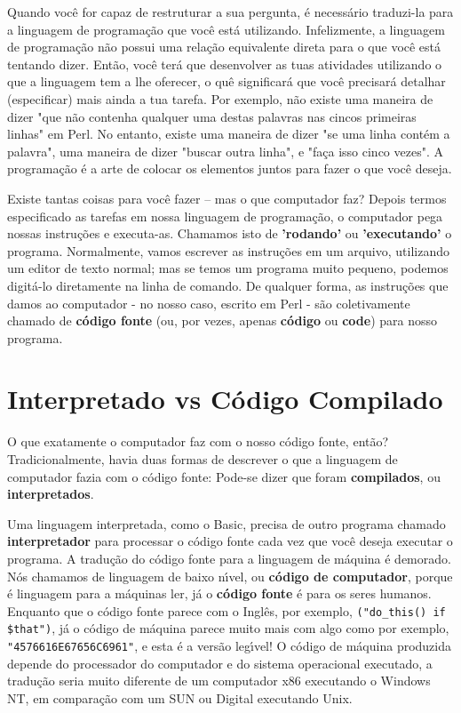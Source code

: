 \documentclass[a4paper,11pt]{book}
\begin{document}
\noindent 

\noindent Quando voc\^e for capaz de restruturar a sua pergunta, \'e necess\'ario traduzi-la para a linguagem de programa\c{c}\~ao que voc\^e est\'a utilizando. Infelizmente, a linguagem de programa\c{c}\~ao n\~ao possui uma rela\c{c}\~ao equivalente direta para o que voc\^e est\'a tentando dizer. Ent\~ao, voc\^e ter\'a que desenvolver as tuas atividades utilizando o que a linguagem tem a lhe oferecer, o qu\^e significar\'a que voc\^e precisar\'a detalhar (especificar) mais ainda a tua tarefa. Por exemplo, n\~ao existe uma maneira de dizer "que n\~ao contenha qualquer uma destas palavras nas cincos primeiras linhas" em Perl. No entanto, existe uma maneira de dizer "se uma linha cont\'em a palavra", uma maneira de dizer "buscar outra linha", e "fa\c{c}a isso cinco vezes". A programa\c{c}\~ao \'e a arte de colocar os elementos juntos para fazer o que voc\^e deseja.

\noindent 

\noindent Existe tantas coisas para voc\^e fazer – mas o que computador faz? Depois termos especificado as tarefas em nossa linguagem de programa\c{c}\~ao, o computador pega nossas instru\c{c}\~oes e executa-as. Chamamos isto de \textbf{'rodando'} ou \textbf{'executando'} o programa. Normalmente, vamos escrever as instru\c{c}\~oes em um arquivo, utilizando um editor de texto normal; mas se temos um programa muito pequeno, podemos digit\'a-lo diretamente na linha de comando. De qualquer forma, as instru\c{c}\~oes que damos ao computador - no nosso caso, escrito em Perl - s\~ao coletivamente chamado de \textbf{c\'odigo fonte} (ou, por vezes, apenas \textbf{c\'odigo} ou \textbf{code}) para nosso programa.

\section{Interpretado vs C\'odigo Compilado}

\noindent O que exatamente o computador faz com o nosso c\'odigo fonte, ent\~ao? Tradicionalmente, havia duas formas de descrever o que a linguagem de computador fazia com o c\'odigo fonte: Pode-se dizer que foram \textbf{compilados}, ou \textbf{interpretados}.

\noindent 

\noindent Uma linguagem interpretada, como o Basic, precisa de outro programa chamado \textbf{interpretador} para processar o c\'odigo fonte cada vez que voc\^e deseja executar o programa. A tradu\c{c}\~ao do c\'odigo fonte para a linguagem de m\'aquina \'e demorado. N\'os chamamos de linguagem de baixo n\'{\i}vel, ou \textbf{c\'odigo de computador}, porque \'e linguagem para a m\'aquinas ler, j\'a o \textbf{c\'odigo fonte} \'e para os seres humanos. Enquanto que o c\'odigo fonte parece com o Ingl\^es, por exemplo, \texttt{("do\_this() if \$that")}, j\'a o c\'odigo de m\'aquina parece muito mais com algo como por exemplo, \texttt{"4576616E67656C6961"}, e esta \'e a vers\~ao leg\'{\i}vel! O c\'odigo de m\'aquina produzida depende do processador do computador e do sistema operacional executado, a tradu\c{c}\~ao seria muito diferente de um computador x86 executando o Windows NT, em compara\c{c}\~ao com um SUN ou Digital executando Unix.
\end{document}
